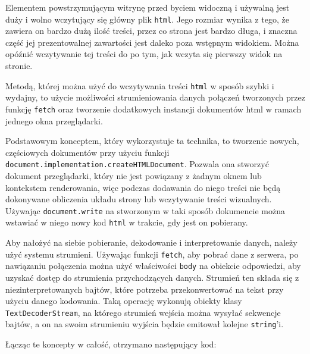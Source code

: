 \documentclass[licencjacka]{pracadypl}
\begin{document}
Elementem powstrzymującym witrynę przed byciem widoczną i używalną jest duży i wolno wczytujący się główny plik \texttt{html}. Jego rozmiar wynika z tego, że zawiera on bardzo dużą ilość treści, przez co strona jest bardzo długa, i znaczna część jej prezentowalnej zawartości jest daleko poza wstępnym widokiem. Można opóźnić wczytywanie tej treści do po tym, jak wczyta się pierwszy widok na stronie.

Metodą, której można użyć do wczytywania treści \texttt{html} w sposób szybki i wydajny, to użycie możliwości strumieniowania danych połączeń tworzonych przez funkcję \texttt{fetch} oraz tworzenie dodatkowych instancji dokumentów html w ramach jednego okna przeglądarki.

Podstawowym konceptem, który wykorzystuje ta technika, to tworzenie nowych, częściowych dokumentów przy użyciu funkcji \texttt{document.implementation.createHTMLDocument}. Pozwala ona stworzyć dokument przeglądarki, który nie jest powiązany z żadnym oknem lub kontekstem renderowania, więc podczas dodawania do niego treści nie będą dokonywane obliczenia układu strony lub wczytywanie treści wizualnych. Używając \texttt{document.write} na stworzonym w taki sposób dokumencie można wstawiać w niego nowy kod \texttt{html} w trakcie, gdy jest on pobierany.

Aby nałożyć na siebie pobieranie, dekodowanie i interpretowanie danych, należy użyć systemu strumieni. Używając funkcji \texttt{fetch}, aby pobrać dane z serwera, po nawiązaniu połączenia można użyć właściwości \texttt{body} na obiekcie odpowiedzi, aby uzyskać dostęp do strumienia przychodzących danych. Strumień ten składa się z niezinterpretowanych bajtów, które potrzeba przekonwertować na tekst przy użyciu danego kodowania. Taką operację wykonują obiekty klasy \texttt{TextDecoderStream}, na którego strumień wejścia można wysyłać sekwencje bajtów, a on na swoim strumieniu wyjścia będzie emitował kolejne \texttt{string}'i. 

Łącząc te koncepty w całość, otrzymano następujący kod:
\end{document}
